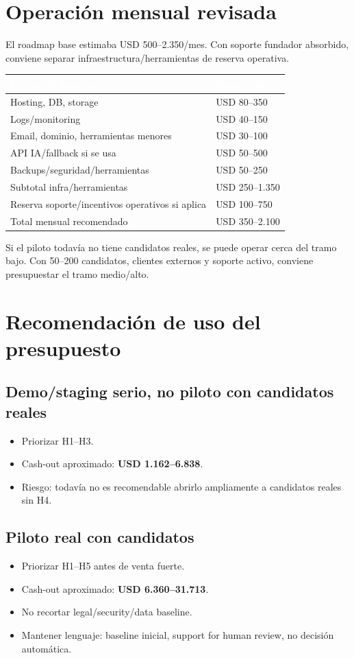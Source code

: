 \documentclass[11pt,a4paper]{article}
\begin{document}
\clearpage
\section{Operación mensual revisada}
El roadmap base estimaba USD 500--2.350/mes. Con soporte fundador absorbido, conviene separar infraestructura/herramientas de reserva operativa.

\begin{tabularx}{\linewidth}{@{}L Y@{}}
\toprule
{}\textcolor{white}{\textbf{Categoría mensual}} & \textcolor{white}{\textbf{Rango cash}} \\
\midrule
Hosting, DB, storage & USD 80--350 \\
Logs/monitoring & USD 40--150 \\
Email, dominio, herramientas menores & USD 30--100 \\
API IA/fallback si se usa & USD 50--500 \\
Backups/seguridad/herramientas & USD 50--250 \\
Subtotal infra/herramientas & USD 250--1.350 \\
Reserva soporte/incentivos operativos si aplica & USD 100--750 \\
Total mensual recomendado & USD 350--2.100 \\

\bottomrule
\end{tabularx}

Si el piloto todavía no tiene candidatos reales, se puede operar cerca del tramo bajo. Con 50--200 candidatos, clientes externos y soporte activo, conviene presupuestar el tramo medio/alto.

\section{Recomendación de uso del presupuesto}
\subsection{Demo/staging serio, no piloto con candidatos reales}
\begin{itemize}
  \item Priorizar H1--H3.
  \item Cash-out aproximado: \textbf{USD 1.162--6.838}.
  \item Riesgo: todavía no es recomendable abrirlo ampliamente a candidatos reales sin H4.
\end{itemize}

\subsection{Piloto real con candidatos}
\begin{itemize}
  \item Priorizar H1--H5 antes de venta fuerte.
  \item Cash-out aproximado: \textbf{USD 6.360--31.713}.
  \item No recortar legal/security/data baseline.
  \item Mantener lenguaje: baseline inicial, support for human review, no decisión automática.
\end{itemize}
\end{document}
